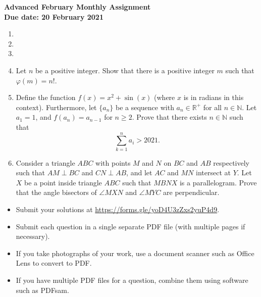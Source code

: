\documentclass{article}
\begin{document}
\thispagestyle{empty}

\begin{center}
  \textbf{\Large Advanced February Monthly Assignment}
  \\ \vspace{1em}
  \textbf{\large Due date: 20 February 2021}
\end{center}

\vspace{12pt}

\begin{enumerate}[1.]

\item %


\item %


\item %


\item %
Let $n$ be a positive integer. Show that there is a positive integer $m$ such that $\varphi(m) = n!$.


\item %
Define the function $f(x) = x^2 + \sin(x)$ (where $x$ is in radians in this context). Furthermore, let $\{a_n\}$ be a sequence with $a_n \in \mathbb{R}^+$ for all $n \in \mathbb{N}$. Let $a_1 = 1$, and $f(a_n) = a_{n - 1}$ for $n \ge 2$. Prove that there exists $n \in \mathbb{N}$ such that 
$$\sum_{k = 1}^n a_i > 2021.$$


\item %
Consider a triangle $ABC$ with points $M$ and $N$ on $BC$ and $AB$ respectively such that $AM \perp BC$ and $CN \perp AB$, and let $AC$ and $MN$ intersect at $Y$.
Let $X$ be a point inside triangle $ABC$ such that $MBNX$ is a parallelogram.
Prove that the angle bisectors of $\angle MXN$ and $\angle MYC$ are perpendicular.


\end{enumerate}


\vfill
\begin{itemize}
	\item Submit your solutions at \url{https://forms.gle/yoD4U3zZxs2yuP4d9}.
	\item Submit each question in a single separate PDF file (with multiple pages if necessary).
	\item If you take photographs of your work, use a document scanner such as Office Lens to convert to PDF.
	\item If you have multiple PDF files for a question, combine them using software such as PDFsam.
\end{itemize}
\end{document}
